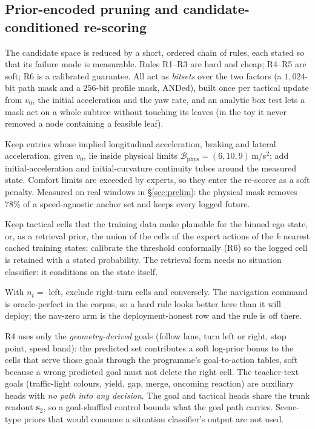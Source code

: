 \subsection{Prior-encoded pruning and candidate-conditioned re-scoring}\label{sec:prune}
The candidate space is reduced by a short, ordered chain of rules, each stated so that its failure mode is measurable. Rules R1--R3 are hard and cheap; R4--R5 are soft; R6 is a calibrated guarantee. All act as \emph{bitsets} over the two factors (a $1{,}024$-bit path mask and a $256$-bit profile mask, ANDed), built once per tactical update from $v_0$, the initial acceleration and the yaw rate, and an analytic box test lets a mask act on a whole subtree without touching its leaves (in the toy it never removed a node containing a feasible leaf).
\begin{description}[leftmargin=2.2em,style=nextline]
\item[R1 Kinematic feasibility (hard = physical limits; comfort = soft cost).] Keep entries whose implied longitudinal acceleration, braking and lateral acceleration, given $v_0$, lie inside physical limits $\mathcal B_{\text{phys}}=(6,10,9)$\,m/s$^2$; add initial-acceleration and initial-curvature continuity tubes around the measured state. Comfort limits are exceeded by experts, so they enter the re-scorer as a soft penalty. Measured on real windows in \S\ref{sec:prelim}: the physical mask removes $78\%$ of a speed-agnostic anchor set and keeps every logged future.
\item[R2 State-conditioned admissibility (hard, calibrated).] Keep tactical cells that the training data make plausible for the binned ego state, or, as a retrieval prior, the union of the cells of the expert actions of the $k$ nearest cached training states; calibrate the threshold conformally (R6) so the logged cell is retained with a stated probability. The retrieval form needs no situation classifier: it conditions on the state itself.
\item[R3 Route consistency (hard in the nav-fed arm only).] With $n_t=$ left, exclude right-turn cells and conversely. The navigation command is oracle-perfect in the corpus, so a hard rule looks better here than it will deploy; the nav-zero arm is the deployment-honest row and the rule is off there.
\item[R4 Goal admissibility (soft).] R4 uses only the \emph{geometry-derived} goals (follow lane, turn left or right, stop point, speed band): the predicted set contributes a soft log-prior bonus to the cells that serve those goals through the programme's goal-to-action tables, soft because a wrong predicted goal must not delete the right cell. The teacher-text goals (traffic-light colours, yield, gap, merge, oncoming reaction) are auxiliary heads with \emph{no path into any decision}. The goal and tactical heads share the trunk readout $\mathbf s_2$, so a goal-shuffled control bounds what the goal path carries. Scene-type priors that would consume a situation classifier's output are not used.

\end{description}
